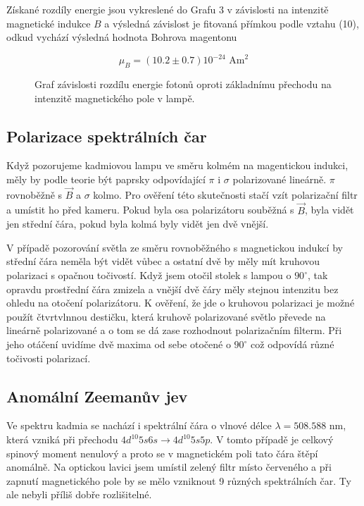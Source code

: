 \documentclass[a4paper,11pt]{article}
\begin{document}
Získané rozdíly energie jsou vykreslené do Grafu 3 v závislosti na intenzitě magnetické indukce $ B $ a výsledná závislost je fitovaná přímkou podle vztahu (10), odkud vychází výsledná hodnota Bohrova magentonu

\begin{equation}
\mu_B = (10.2 \pm 0.7) 10^{-24} \text{ Am}^2
\end{equation}

\begin{figure}[htpb]
    \centering
    
    \captionsetup{type=graph}
    \caption{ Graf závislosti rozdílu energie fotonů oproti základnímu přechodu na intenzitě magnetického pole v lampě.   }
\end{figure}

\subsection{Polarizace spektrálních čar}

Když pozorujeme kadmiovou lampu ve směru kolmém na magentickou indukci, měly by podle teorie být paprsky odpovídající $ \pi $ i $ \sigma $ polarizované lineárně. $ \pi $ rovnoběžně s $ \vec{B} $ a $ \sigma $ kolmo. Pro ověření této skutečnosti stačí vzít polarizační filtr a umístit ho před kameru. Pokud byla osa polarizátoru souběžná s $ \vec{B} $, byla vidět jen střední čára, pokud byla kolmá byly vidět jen dvě vnější. 

V případě pozorování světla ze směru rovnoběžného s magnetickou indukcí by střední čára neměla být vidět vůbec a ostatní dvě by měly mít kruhovou polarizaci s opačnou točivostí. Když jsem otočil stolek s lampou o $ 90 ^{\circ} $, tak opravdu prostřední čára zmizela a vnější dvě čáry měly stejnou intenzitu bez ohledu na otočení polarizátoru. K ověření, že jde o kruhovou polarizaci je možné použít čtvrtvlnnou destičku, která kruhově polarizované světlo převede na lineárně polarizované a o tom se dá zase rozhodnout polarizačním filterm. Při jeho otáčení uvidíme dvě maxima od sebe otočené o $ 90 ^{\circ} $ což odpovídá různé točivosti polarizací. 

\subsection{Anomální Zeemanův jev}

Ve spektru kadmia se nachází i spektrální čára o vlnové délce $ \lambda = 508.588 $ nm, která vzniká při přechodu $ 4d^{10}5s6s \to  4d^{10}5s5p $. V tomto případě je celkový spinový moment nenulový a proto se v magnetickém poli tato čára štěpí anomálně. Na optickou lavici jsem umístil zelený filtr místo červeného a při zapnutí magnetického pole by se mělo vzniknout 9 různých spektrálních čar. Ty ale nebyli příliš dobře rozlišitelné. 
\end{document}
